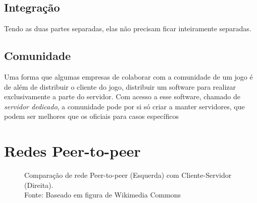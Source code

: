   \subsection{Integração}
    Tendo as duas partes separadas, elas não precisam ficar inteiramente separadas.
    
  \subsection{Comunidade}
    Uma forma que algumas empresas de colaborar com a comunidade de um jogo é de além de
    distribuir o cliente do jogo, distribuir um software para realizar exclusivamente a parte
    do servidor. Com acesso a esse software, chamado de \textit{servidor dedicado}, a comunidade
    pode por si só criar a manter servidores, que podem ser melhores que os oficiais para casos
    específicos

\section{Redes Peer-to-peer}
\label{sec:conceitos:redes}

  \begin{figure}[h]
    \begin{centering}
    \caption{Comparação de rede Peer-to-peer (Esquerda) com Cliente-Servidor (Direita). \\
      Fonte: Baseado em figura de Wikimedia Commons}
    \end{centering}
  \end{figure}

